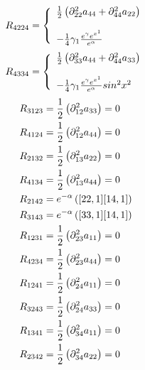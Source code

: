 \begin{align}
R_{4224}&= \left\{\begin{array}{l}
\frac{1}{2}\left( \partial^2_{22} a_{44} + \partial^2_{44} a_{22} \right)\\\\
-\frac{1}{4} \gamma _1  \frac{e^{\gamma}e^{x^1}}{e^{\alpha}}\\
\end {array}\right.\\
\end{align}
\begin{align}
R_{4334}&= \left\{\begin{array}{l}
\frac{1}{2}\left( \partial^2_{33} a_{44} + \partial^2_{44} a_{33} \right)\\\\
-\frac{1}{4} \gamma _1  \frac{e^{\gamma}e^{x^1}}{e^{\alpha}}sin^2 x^2 \\
\end {array}\right.\\
\end{align}
\begin{align}
R_{3123}&= 
\frac{1}{2}\left( \partial^2_{12} a_{33}\right)=0\\
R_{4124}&= 
\frac{1}{2}\left( \partial^2_{12} a_{44}  \right)=0\\
R_{2132}&= 
\frac{1}{2}\left( \partial^2_{13} a_{22}  \right)=0\\
R_{4134}&= 
\frac{1}{2}\left( \partial^2_{13} a_{44} \right)=0\\
R_{2142}&= 
 e^{-\alpha}\left([22,1][14,1]\right)\\
R_{3143}&= 
e^{-\alpha}\left([33,1][14,1]\right)\\
R_{1231}&= 
\frac{1}{2}\left( \partial^2_{23} a_{11} \right)=0\\
R_{4234}&= 
\frac{1}{2}\left( \partial^2_{23} a_{44}  \right)=0\\
R_{1241}&= 
\frac{1}{2}\left( \partial^2_{24} a_{11} \right)=0\\
R_{3243}&= 
\frac{1}{2}\left( \partial^2_{24} a_{33}  \right)=0\\
R_{1341}&= 
\frac{1}{2}\left( \partial^2_{34} a_{11} \right)=0\\
R_{2342}&= 
\frac{1}{2}\left( \partial^2_{34} a_{22} \right)=0
\end{align}

